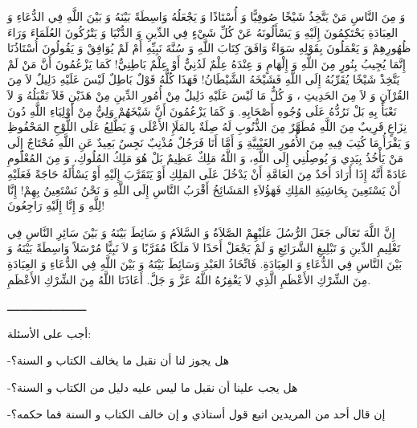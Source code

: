 \documentclass[a5paper]{article}
\begin{document}
وَ مِنَ النَّاسِ مَنْ يَتَّخِذُ شَيْخًا صُوفِيًّا وَ أُسْتَاذًا وَ يَجْعَلُهُ وَاسِطَةً بَيْنَهُ وَ بَيْنَ اللَّهِ فِي الدُّعَاءِ وَ العِبَادَةِ يَحْتَكِمُونَ إِلَيْهِ وَ يَسْأَلُونَهُ عَنْ كُلِّ شَيْءٍ فِي الدِّينِ وَ الدُّنْيَا وَ يَتْرُكُونَ العُلَمَاءَ وَرَاءَ ظُهُورِهِمْ وَ يَعْمَلُونَ بِقَوْلِهِ سَوَاءٌ وَافَقَ كِتَابَ اللَّهِ وَ سُنَّةَ نَبِيِّهِ أَمْ لَمْ يُوَافِقْ وَ يَقُولُونَ أُسْتَاذُنَا إِنَّمَا يُجِيبُ بِنُورٍ مِنَ اللَّهِ وَ إِلْهَامٍ وَ عِنْدَهُ عِلْمٌ لَدُنِيٌّ أَوْ عِلْمٌ بَاطِنِيٌّ! كَمَا يَزْعُمُونَ أَنَّ مَنْ لَمْ يَتَّخِذْ شَيْخًا يُقَرِّبُهُ إِلَى اللَّهِ فَشَيْخَهُ الشَّيْطَانُ! فَهَذَا كُلُّهُ قَوْلٌ بَاطِلٌ لَيْسَ عَلَيْهِ دَلِيلٌ لاَ مِنَ القُرْآنِ وَ لاَ مِنَ الحَدِيثِ ، وَ كُلُّ مَا لَيْسَ عَلَيْهِ دَلِيلٌ مِنْ أُمُورِ الدِّينِ مِنْ هَذَيْنِ فَلاَ نَقْبَلُهُ وَ لاَ نَعْبَأُ بِهِ بَلْ نَرُدُّهُ عَلَى وُجُوهِ أَصْحَابِهِ. وَ كَمَا يَزْعُمُونَ أَنَّ شَيْخَهُمْ وَلِيٌّ مِنْ أَوْلِيَاءِ اللَّهِ دُونَ نِزَاعٍ قَرِيبٌ مِنَ اللَّهِ مُطَهَّرٌ مِنَ الذُّنُوبِ لَهُ صِلَةٌ بِالمَلَإِ الأَعْلَى وَِ يَطَّلِعُ عَلَى اللَّوْحِ المَحْفُوظِ وَ يَقْرَأُ مَا كُتِبَ فِيهِ مِنَ الأُمُورِ الغَيْبِيَّةِ وَ أَمَّا أَنَا فَرَجُلٌ مُذْنِبٌ نَجِسٌ بَعِيدٌ عَنِ اللَّهِ مُحْتَاجٌ إِلَى مَنْ يَأْخُذُ بِيَدِي وَ يُوصِلُنِي إِلَى اللَّهِ، وَ اللَّهُ مَلِكٌ عَظِيمٌ بَلْ هُوَ مَلِكُ المُلُوكِ، وَ مِنَ المُعْلُومِ عَادَةً أَنَّهُ إِذَا أَرَادَ أَحَدٌ مِنَ العَامَّةِ أَنْ يَدْخُلَ عَلَى المَلِكِ أَوْ يَتَقَرَّبَ إِلَيْهِ أَوْ يَسْأَلَهُ حَاجَةً فَعَلَيْهِ أَنْ يَسْتَعِينَ بِحَاشِيَةِ المَلِكِ فَهَؤُلاَءِ المَشَائِخُ أَقْرَبُ النَّاسِ إِلَى اللَّهِ وَ نَحْنُ نَسْتَعِينُ بِهِمْ! إِنَّا لِلَّهِ وَ إِنَّا إِلَيْهِ رَاجِعُونَ! 

إِنَّ اللَّهَ تَعَالَى جَعَلَ الرُّسُلَ عَلَيْهِمْ الصَّلاَةُ وَ السَّلاَمُ وَ سَائِطَ بَيْنَهُ وَ بَيْنَ سَائِرِ النَّاسِ فِي تَعْلِيمِ الدِّينِ وَ تَبْلِيغِ الشَّرَائِعِ وَ لَمْ يَجْعَلْ أَحَدًا لاَ مَلَكًا مُقَرَّبًا وَ لاَ نَبِيًّا مُرْسَلاً وَاسِطَةً بَيْنَهُ وَ بَيْنَ النَّاسِ فِي الدُّعَاءِ وَ العِبَادَةِ. فَاتِّخَاذُ العَبْدِ وَسَائِطَ بَيْنَهُ وَ بَيْنَ اللَّهِ فِي الدُّعَاءِ وَ العِبَادَةِ مِنَ الشِّرْكِ الأَعْظَمِ الَّذِي لاَ يَغْفِرُهُ اللَّهُ عَزَّ وَ جَلَّ. أَعَاذَنَا اللَّهُ مِنَ الشِّرْكِ الأَعْظَمِ.

ــــــــــــــــــــــــ

أجب على الأسئلة:

-هل يجوز لنا أن نقبل ما يخالف الكتاب و السنة؟

-هل يجب علينا أن نقبل ما ليس عليه دليل من الكتاب و السنة؟

-إن قال أحد من المريدين اتبع قول أستاذي و إن خالف الكتاب و السنة فما حكمه؟
\end{document}
